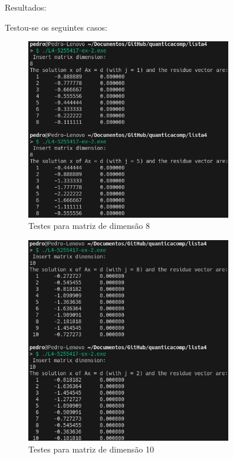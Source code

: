 \documentclass[12pt, a4paper]{article} %
\begin{document}
        Resultados:

        Testou-se os seguintes casos:
        \begin{figure}[H]
            \centering
            \includegraphics[width=0.8\textwidth]{../images/ex2-results-8.png}
            \caption{Testes para matriz de dimensão 8}
        \end{figure}
        \begin{figure}[H]
            \centering
            \includegraphics[width=0.8\textwidth]{../images/ex2-results-10.png}
            \caption{Testes para matriz de dimensão 10}
        \end{figure}
\end{document}
